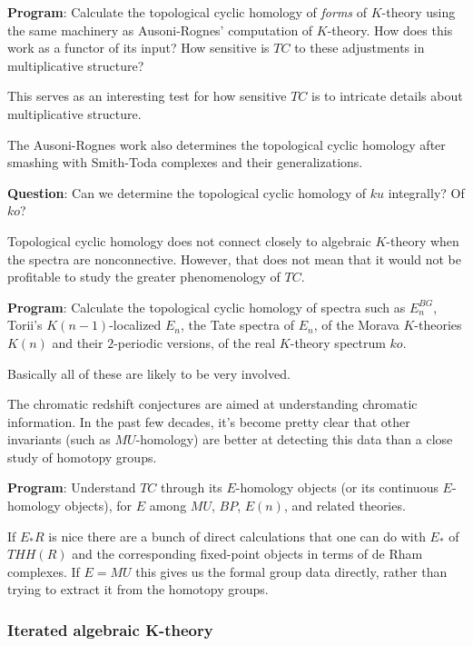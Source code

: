 \documentclass[12pt,titlepage]{article}
\theoremstyle{plain}
\theoremstyle{definition}
\theoremstyle{remark}
\begin{document}
\textbf{Program}: Calculate the topological cyclic homology of \emph{forms} of $K$-theory using the same machinery as Ausoni-Rognes'{} computation of $K$-theory. How does this work as a functor of its input? How sensitive is $TC$ to these adjustments in multiplicative structure?

This serves as an interesting test for how sensitive $TC$ is to intricate details about multiplicative structure.

The Ausoni-Rognes work also determines the topological cyclic homology after smashing with Smith-Toda complexes and their generalizations.

\textbf{Question}: Can we determine the topological cyclic homology of $ku$ integrally? Of $ko$?

Topological cyclic homology does not connect closely to algebraic $K$-theory when the spectra are nonconnective. However, that does not mean that it would not be profitable to study the greater phenomenology of $TC$.

\textbf{Program}: Calculate the topological cyclic homology of spectra such as $E_n^{BG}$, Torii'{}s $K(n-1)$-localized $E_n$, the Tate spectra of $E_n$, of the Morava $K$-theories $K(n)$ and their $2$-periodic versions, of the real $K$-theory spectrum $ko$.

Basically all of these are likely to be very involved.

The chromatic redshift conjectures are aimed at understanding chromatic information. In the past few decades, it'{}s become pretty clear that other invariants (such as $MU$-homology) are better at detecting this data than a close study of homotopy groups.

\textbf{Program}: Understand $TC$ through its $E$-homology objects (or its continuous $E$-homology objects), for $E$ among $MU$, $BP$, $E(n)$, and related theories.

If $E_* R$ is nice there are a bunch of direct calculations that one can do with $E_*$ of $THH(R)$ and the corresponding fixed-point objects in terms of de Rham complexes. If $E = MU$ this gives us the formal group data directly, rather than trying to extract it from the homotopy groups.

\hypertarget{iterated_algebraic_ktheory_4}{}\subsubsection{{Iterated algebraic K-theory}}\label{iterated_algebraic_ktheory_4}
\end{document}
